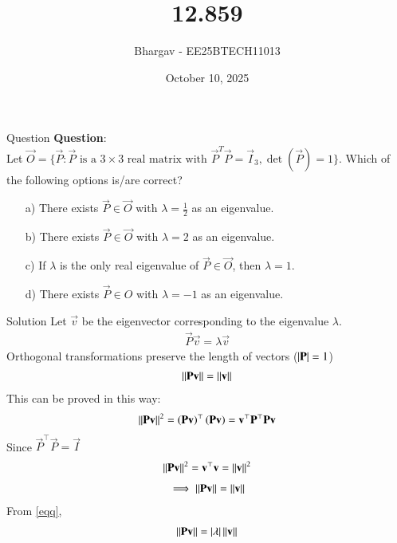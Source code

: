 \documentclass{beamer}
\title{12.859}
\date{October 10, 2025}
\author{Bhargav - EE25BTECH11013}
\begin{document}
\frame{\titlepage}

\begin{frame}{Question}
\textbf{Question}: \\
Let $\vec{O} = \{\vec{P} : \vec{P} \text{ is a } 3 \times 3 \text{ real matrix with } \vec{P}^T\vec{P} = \vec{I}_3, \det(\vec{P}) = 1\}$. Which of the following options is/are correct?

\begin{enumerate}
    \item[a)] There exists $\vec{P} \in \vec{O}$ with $\lambda = \frac{1}{2}$ as an eigenvalue.
    \item[b)] There exists $\vec{P} \in \vec{O}$ with $\lambda = 2$ as an eigenvalue.
    \item[c)] If $\lambda$ is the only real eigenvalue of $\vec{P} \in 
    \vec{O}$, then $\lambda = 1$.
    \item[d)] There exists $\vec{P} \in O$ with $\lambda = -1$ as an eigenvalue.
\end{enumerate}
\end{frame}

\begin{frame}{Solution}
Let $\vec{v}$ be the eigenvector corresponding to the eigenvalue $\lambda$.
\begin{align}
\vec{P}\vec{v} = \lambda\vec{v} \label{eqq}
\end{align}
Orthogonal transformations preserve the length of vectors  ($\left\vert\mathbf{P}\right\vert = 1$)
\begin{align}
\left\lVert\mathbf{P}\mathbf{v}\right\rVert=\left\lVert\mathbf{v}\right\rVert \label{eq1}
\end{align}
This can be proved in this way:
\begin{align}
\left\lVert\mathbf{P}\mathbf{v}\right\rVert^2 = \left(\mathbf{P}\mathbf{v}\right)^\top\left(\mathbf{P}\mathbf{v}\right)=\mathbf{v}^\top\mathbf{P}^\top\mathbf{P}\mathbf{v}
\end{align}
Since $\vec{P}^\top \vec{P} = \vec{I}$
\begin{align}
\left\lVert\mathbf{P}\mathbf{v}\right\rVert^2 = \mathbf{v}^\top\mathbf{v} = \left\lVert\mathbf{v}\right\rVert^2
\end{align}
\begin{align}
\implies \left\lVert\mathbf{P}\mathbf{v}\right\rVert = \left\lVert\mathbf{v}\right\rVert
\end{align}
From \eqref{eqq},
\begin{align}
\left\lVert\mathbf{P}\mathbf{v}\right\rVert = \left\vert\lambda\right\vert\left\lVert\mathbf{v}\right\rVert \label{eq2}
\end{align}


\end{frame}
\end{document}
